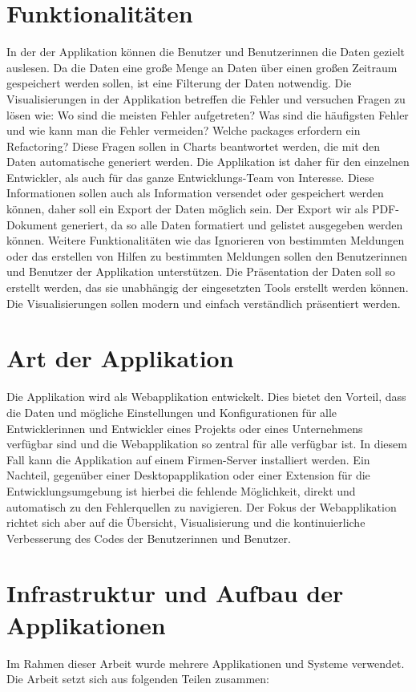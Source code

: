 \section{Funktionalitäten}
In der der Applikation können die Benutzer und Benutzerinnen die Daten gezielt auslesen. Da die Daten eine große Menge an Daten über einen großen Zeitraum gespeichert werden sollen, ist eine Filterung der Daten notwendig. Die Visualisierungen in der Applikation betreffen die Fehler und versuchen Fragen zu lösen wie: Wo sind die meisten Fehler aufgetreten? Was sind die häufigsten Fehler und wie kann man die Fehler vermeiden? Welche packages erfordern ein Refactoring? Diese Fragen sollen in Charts beantwortet werden, die mit den Daten automatische generiert werden. Die Applikation ist daher für den einzelnen Entwickler, als auch für das ganze Entwicklungs-Team von Interesse. Diese Informationen sollen auch als Information versendet oder gespeichert werden können, daher soll ein Export der Daten möglich sein. Der Export wir als PDF-Dokument generiert, da so alle Daten formatiert und gelistet ausgegeben werden können. Weitere Funktionalitäten wie das Ignorieren von bestimmten Meldungen oder das erstellen von Hilfen zu bestimmten Meldungen sollen den Benutzerinnen und Benutzer der Applikation unterstützen. Die Präsentation der Daten soll so erstellt werden, das sie unabhängig der eingesetzten Tools erstellt werden können. Die Visualisierungen sollen modern und einfach verständlich präsentiert werden.
\section{Art der Applikation}
Die Applikation wird als Webapplikation entwickelt. Dies bietet den Vorteil, dass die Daten und mögliche Einstellungen und Konfigurationen für alle Entwicklerinnen und Entwickler eines Projekts oder eines Unternehmens verfügbar sind und die Webapplikation so zentral für alle verfügbar ist. In diesem Fall kann die Applikation auf einem Firmen-Server installiert werden. Ein Nachteil, gegenüber einer Desktopapplikation oder einer Extension für die Entwicklungsumgebung ist hierbei die fehlende Möglichkeit, direkt und automatisch zu den Fehlerquellen zu navigieren. Der Fokus der Webapplikation richtet sich aber auf die Übersicht, Visualisierung und die kontinuierliche Verbesserung des Codes der Benutzerinnen und Benutzer. 
\section{Infrastruktur und Aufbau der Applikationen} 
Im Rahmen dieser Arbeit wurde mehrere Applikationen und Systeme verwendet. Die Arbeit setzt sich aus folgenden Teilen zusammen:

